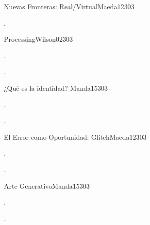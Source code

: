 \begin{syllabus}
\begin{unit}{Nuevas Fronteras: Real/Virtual}{}{Maeda12}{30}{3}
   \begin{learningoutcomes}
      \item .
   \end{learningoutcomes}
\end{unit}

\begin{unit}{Processing}{}{Wilson02}{30}{3}
   \begin{topics}
      \item . 
   \end{topics}

   \begin{learningoutcomes}
      \item .
   \end{learningoutcomes}
\end{unit}

\begin{unit}{¿Qué es la identidad? }{}{Manda15}{30}{3}
   \begin{topics}
      \item . 
   \end{topics}

   \begin{learningoutcomes}
      \item . 
   \end{learningoutcomes}
\end{unit}

\begin{unit}{El Error como Oportunidad: Glitch}{}{Maeda12}{30}{3}
   \begin{topics}
      \item .
   \end{topics}

   \begin{learningoutcomes}
      \item . 
   \end{learningoutcomes}
\end{unit}

\begin{unit}{Arte Generativo}{}{Manda15}{30}{3}
   \begin{topics}
      \item . 
   \end{topics}

   \begin{learningoutcomes}
      \item . 
   \end{learningoutcomes}
\end{unit}


\end{syllabus}
